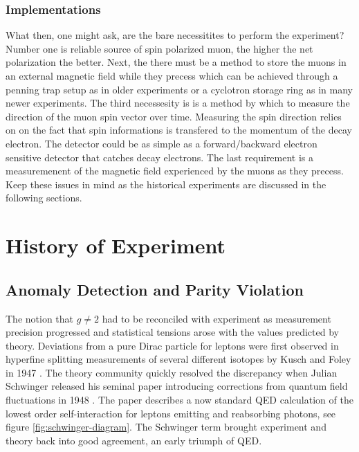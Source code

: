 \subsubsection{Implementations}

What then, one might ask, are the bare necessitites to perform the \gmtwo experiment?  Number one is reliable source of spin polarized muon, the higher the net polarization the better.  Next, the there must be a method to store the muons in an external magnetic field while they precess which can be achieved through a penning trap setup as in older experiments or a cyclotron storage ring as in many newer experiments.  The third necessesity is is a method by which to measure the direction of the muon spin vector over time.  Measuring the spin direction relies on on the fact that spin informations is transfered to the momentum of the decay electron.  The detector could be as simple as a forward/backward electron sensitive detector that catches decay electrons.  The last requirement is a measuremenent of the magnetic field experienced by the muons as they precess.  Keep these issues in mind as the historical experiments are discussed in the following sections.

\section{History of Experiment} \label{sec:history-expt}

\subsection{Anomaly Detection and Parity Violation}

The notion that $g \ne 2$ had to be reconciled with experiment as measurement precision progressed and statistical tensions arose with the values predicted by theory.  Deviations from a pure Dirac particle for leptons were first observed in hyperfine splitting measurements of several different isotopes by Kusch and Foley in 1947 \cite{kusch-foley}.  The theory community quickly resolved the discrepancy when Julian Schwinger released his seminal paper introducing corrections from quantum field fluctuations in 1948 \cite{schwinger}.  The paper describes a now standard QED calculation of the lowest order self-interaction for leptons emitting and reabsorbing photons, see figure \ref{fig:schwinger-diagram}.  The Schwinger term brought experiment and theory back into good agreement, an early triumph of QED.

